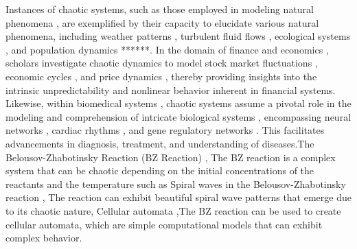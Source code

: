 \documentclass[11pt]{article}
\begin{document}
Instances of chaotic systems, such as those employed in modeling natural phenomena \cite{sanabria_modelling_2020}, are exemplified by their capacity to elucidate various natural phenomena, including weather patterns \cite{noauthor_weather_nodate}, turbulent fluid flows \cite{noauthor_turbulent_nodate}, ecological systems \cite{crawford_ecological_2020}, and population dynamics \cite{noauthor_population_nodate}******. In the domain of finance and economics \cite{liao_study_2020}, scholars investigate chaotic dynamics to model stock market fluctuations \cite{vogl_chaos_2024}, economic cycles \cite{tusset_dynamic_2023}, and price dynamics \cite{ait_omar_chaotic_2022}, thereby providing insights into the intrinsic unpredictability and nonlinear behavior inherent in financial systems. Likewise, within biomedical systems \cite{grigorenko_study_2022}, chaotic systems assume a pivotal role in the modeling and comprehension of intricate biological systems \cite{li_incorporating_2023}, encompassing neural networks \cite{lin_chaotic_2020}, cardiac rhythms \cite{cheffer_biochaos_2022}, and gene regulatory networks \cite{uthamacumaran_review_2021}. This facilitates advancements in diagnosis, treatment, and understanding of diseases.The Belousov-Zhabotinsky Reaction (BZ Reaction) \cite{karimov_empirically_2023}, The BZ reaction is a complex system that can be chaotic depending on the initial concentrations of the reactants and the temperature such as Spiral waves in the Belousov-Zhabotinsky reaction \cite{luengviriya_meandering_2013}, The reaction can exhibit beautiful spiral wave patterns that emerge due to its chaotic nature, Cellular automata \cite{chopard_cellular_2022},The BZ reaction can be used to create cellular automata, which are simple computational models that can exhibit complex behavior.
\end{document}
